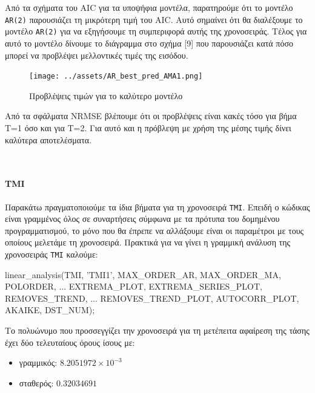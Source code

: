 \documentclass[11pt,]{article}
\newenvironment{Shaded}{}{}
\newcommand{\NormalTok}[1]{#1}
\newcommand{\StringTok}[1]{\textcolor[rgb]{0.25,0.44,0.63}{#1}}
\providecommand{\tightlist}{%
  \setlength{\itemsep}{0pt}\setlength{\parskip}{0pt}}
\let\oldparagraph\paragraph
\renewcommand{\paragraph}[1]{\oldparagraph{#1}\mbox{}}
\begin{document}
Από τα σχήματα του AIC για τα υποψήφια μοντέλα, παρατηρούμε ότι το
μοντέλο \texttt{AR(2)} παρουσιάζει τη μικρότερη τιμή του AIC. Αυτό
σημαίνει ότι θα διαλέξουμε το μοντέλο \texttt{AR(2)} για να εξηγήσουμε
τη συμπεριφορά αυτής της χρονοσειράς. Τέλος για αυτό το μοντέλο δίνουμε
το διάγραμμα στο σχήμα {[}9{]} που παρουσιάζει κατά πόσο μπορεί να
προβλέψει μελλοντικές τιμές της εισόδου.

\begin{figure}
\centering
\texttt{[image: ../assets/AR\_best\_pred\_AMA1.png]}
\caption{Προβλέψεις τιμών για το καλύτερο μοντέλο}
\end{figure}

Από τα σφάλματα NRMSE βλέπουμε ότι οι προβλέψεις είναι κακές τόσο για
βήμα T=1 όσο και για T=2. Για αυτό και η πρόβλεψη με χρήση της μέσης
τιμής δίνει καλύτερα αποτελέσματα.

~

\hypertarget{tmi}{%
\paragraph{TMI}\label{tmi}}

Παρακάτω πραγματοποιούμε τα ίδια βήματα για τη χρονοσειρά \texttt{TMI}.
Επειδή ο κώδικας είναι γραμμένος όλος σε συναρτήσεις σύμφωνα με τα
πρότυπα του δομημένου προγραμματισμού, το μόνο που θα έπρεπε να
αλλάξουμε είναι οι παραμέτροι με τους οποίους μελετάμε τη χρονοσειρά.
Πρακτικά για να γίνει η γραμμική ανάλυση της χρονοσειράς \texttt{TMI}
καλούμε:

\begin{Shaded}
\begin{Highlighting}[]
\NormalTok{linear_analysis(TMI, }\StringTok{'TMI1'}\NormalTok{, MAX_ORDER_AR, MAX_ORDER_MA, POLORDER, ...}
\NormalTok{                EXTREMA_PLOT, EXTREMA_SERIES_PLOT, REMOVES_TREND, ...}
\NormalTok{                REMOVES_TREND_PLOT, AUTOCORR_PLOT, AKAIKE, DST_NUM);}
\end{Highlighting}
\end{Shaded}

Το πολυώνυμο που προσσεγγίζει την χρονοσειρά για τη μετέπειτα αφαίρεση
της τάσης έχει δύο τελευταίους όρους ίσους με:

\begin{itemize}
\tightlist
\item
  γραμμικός: \(8.2051972\times 10^{-3}\)
\item
  σταθερός: \(0.32034691\)
\end{itemize}
\end{document}
